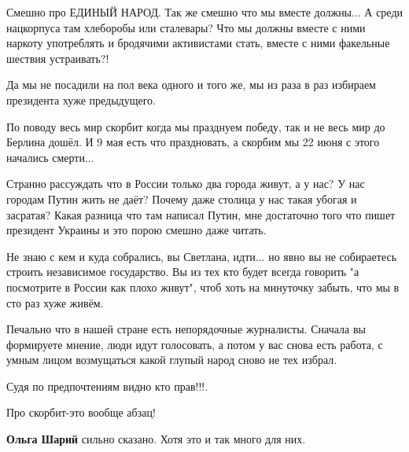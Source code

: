 \begin{itemize}
\begin{itemize}
Смешно про ЕДИНЫЙ НАРОД. Так же смешно что мы вместе должны... А среди
нацкорпуса там хлеборобы или сталевары? Что мы должны вместе с ними наркоту
употреблять и бродячими активистами стать, вместе с ними факельные шествия
устраивать?!

Да мы не посадили на пол века одного и того же, мы из раза в раз избираем
президента хуже предыдущего.

По поводу весь мир скорбит когда мы празднуем победу, так и не весь мир до
Берлина дошёл. И 9 мая есть что праздновать, а скорбим мы 22 июня с этого
начались смерти...

Странно рассуждать что в России только два города живут, а у нас? У нас городам
Путин жить не даёт? Почему даже столица у нас такая убогая и засратая? Какая
разница что там написал Путин, мне достаточно того что пишет президент Украины
и это порою смешно даже читать.

Не знаю с кем и куда собрались, вы Светлана, идти... но явно вы не собираетесь
строить независимое государство. Вы из тех кто будет всегда говорить "а
посмотрите в России как плохо живут", чтоб хоть на минуточку забыть, что мы в
сто раз хуже живём.

Печально что в нашей стране есть непорядочные журналисты. Сначала вы формируете
мнение, люди идут голосовать, а потом у вас снова есть работа, с умным лицом
возмущаться какой глупый народ сново не тех избрал.

 
Судя по предпочтениям видно кто прав!!!.

 
Про скорбит-это вообще абзац!

 
\textbf{Ольга Шарий} сильно сказано. Хотя это и так много для них.

 

\end{itemize}
\end{itemize}
